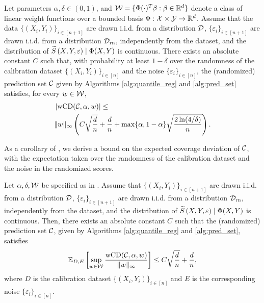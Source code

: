 \begin{theorem}
    Let parameters $\alpha,\delta \in (0,1)$, and ${\cal W} = \{\Phi(\cdot)^T \beta :\beta \in \mathbb{R}^d\}$ denote a class of linear weight functions over a bounded basis $\Phi : {\cal X} \times {\cal Y} \to \mathbb{R}^d$. Assume that the data $\{(X_i,Y_i)\}_{i\in [n+1]}$ are drawn \mbox{i.i.d.} from a distribution ${\cal D}$, $\{\varepsilon_i\}_{i\in [n+1]}$ are drawn \mbox{i.i.d.} from a distribution ${\cal D}_{\text{rn}}$, independently from the dataset, and the distribution of ${\widetilde{S}}\left(X,Y, \varepsilon\right) \mid \Phi(X,Y)$ is continuous. There exists an absolute constant $C$ such that, with probability at least $1-\delta$ over the randomness of the calibration dataset $\{(X_i,Y_i)\}_{i\in [n]}$ and the noise $\{\varepsilon_i\}_{i \in [n]}$, the (randomized) prediction set ${\cal C}$ given by Algorithms \ref{alg:quantile_reg} and \ref{alg:pred_set} satisfies, for every $w \in {\cal W}$,
\begin{align*}
&\left|\text{wCD}({\cal C}, \alpha, w)\right| \leq \\
& \|w\|_{\infty} \left( C \sqrt{\frac{d}{n}} + \frac{d}{n} +\max \{\alpha, 1-\alpha\}\sqrt{\frac{2\ln(4/\delta)}{n}}  \right).
\end{align*}

   \label{thm:jointcondcov}
\end{theorem}
As a corollary of , we derive a bound on the expected coverage deviation of ${\cal C}$, with the expectation taken over the randomness of the calibration dataset and the noise in the randomized scores. 
\begin{corollary}
Let $\alpha, \delta, {\cal W}$ be specified as in . Assume that $\{(X_i,Y_i)\}_{i\in [n+1]}$ are drawn \mbox{i.i.d.} from a distribution ${\cal D}$, $\{\varepsilon_i\}_{i\in [n+1]}$ are drawn \mbox{i.i.d.} from a distribution ${\cal D}_{\text{rn}}$, independently from the dataset, and the distribution of ${\widetilde{S}}\left(X,Y, \varepsilon\right) \mid \Phi(X,Y)$ is continuous. Then, there exists an absolute constant $C$ such that the (randomized) prediction set ${\cal C}$, given by Algorithms \ref{alg:quantile_reg} and \ref{alg:pred_set}, satisfies
\begin{align*}
\mathbb{E}_{D,E}  \left[ \sup_{w\in{\cal W}} \frac{\text{wCD}({\cal C}, \alpha,w)}{\|w\|_{\infty}}\right] \leq 
C \sqrt{\frac{d}{n}} + \frac{d}{n},
\end{align*}
where $D$ is the calibration dataset $\{(X_i,Y_i)\}_{i\in [n]}$ and $E$ is the corresponding noise $\{\varepsilon_i\}_{i\in [n]}$.
\label{cor: expected-cov}
\end{corollary}

